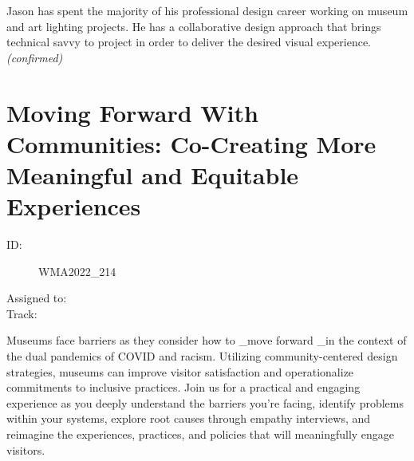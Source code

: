 \documentclass{report}
\begin{document}
                Jason has spent the majority of his professional design career working on museum and art lighting projects. He has a collaborative design approach that brings technical savvy to project in order to deliver the desired visual experience.
                \emph{ (confirmed) }
              

              

              
        
          \newpage
          \section{ Moving Forward With Communities: Co-Creating More Meaningful and Equitable Experiences }
            \begin{description}
              \item [ID:]
              WMA2022\_214

              \item [Assigned to:]
                \item [Track:]
              \end{description}

              Museums face barriers as they consider how to \_move forward \_in the context of the dual pandemics of COVID and racism. Utilizing community-centered design strategies, museums can improve visitor satisfaction and operationalize commitments to inclusive practices. Join us for a practical and engaging experience as you deeply understand the barriers you’re facing, identify problems within your systems, explore root causes through empathy interviews, and reimagine the experiences, practices, and policies that will meaningfully engage visitors.
\end{document}
